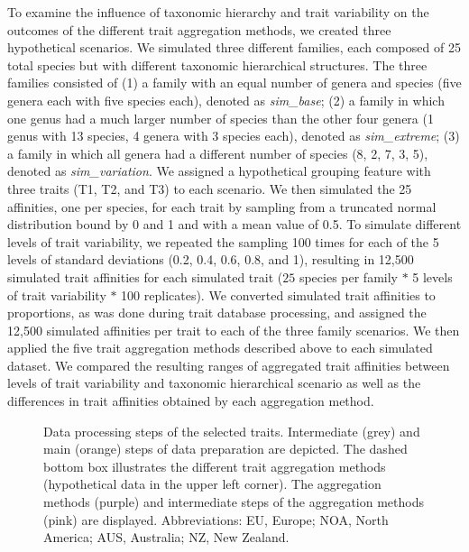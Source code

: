 \documentclass{article}
\begin{document}
To examine the influence of taxonomic hierarchy and trait variability on the outcomes of the different trait aggregation methods, we created three hypothetical scenarios. We simulated three different families, each composed of 25 total species but with different taxonomic hierarchical structures.  The three families consisted of (1) a family with an equal number of genera and species (five genera each with five species each), denoted as \textit{sim\_base}; (2) a family in which one genus had a much larger number of species than the other four genera (1 genus with 13 species, 4 genera with 3 species each), denoted as \textit{sim\_extreme}; (3) a family in which all genera had a different number of species (8, 2, 7, 3, 5), denoted as \textit{sim\_variation}. We assigned a hypothetical grouping feature with three traits (T1, T2, and T3) to each scenario. We then simulated the 25 affinities, one per species, for each trait by sampling from a truncated normal distribution bound by 0 and 1 and with a mean value of 0.5. To simulate different levels of trait variability, we repeated the sampling 100 times for each of the 5 levels of standard deviations (0.2, 0.4, 0.6, 0.8, and 1), resulting in 12,500 simulated trait affinities for each simulated trait ($25$ species per family $*$ 5 levels of trait variability $*$ 100 replicates). We converted simulated trait affinities to proportions, as was done during trait database processing, and assigned the 12,500 simulated affinities per trait to each of the three family scenarios. We then applied the five trait aggregation methods described above to each simulated dataset. We compared the resulting ranges of aggregated trait affinities between levels of trait variability and taxonomic hierarchical scenario as well as the differences in trait affinities obtained by each aggregation method.

\begin{figure}
  \centering
  
  \caption{Data processing steps of the selected traits. Intermediate (grey) and main (orange) steps of data preparation are depicted. The dashed bottom box illustrates the different trait aggregation methods (hypothetical data in the upper left corner). The aggregation methods (purple) and intermediate steps of the aggregation methods (pink) are displayed. Abbreviations: EU, Europe; NOA, North America; AUS, Australia; NZ, New Zealand.}
  \label{fig:data_proc_overview}
\end{figure}
\end{document}
